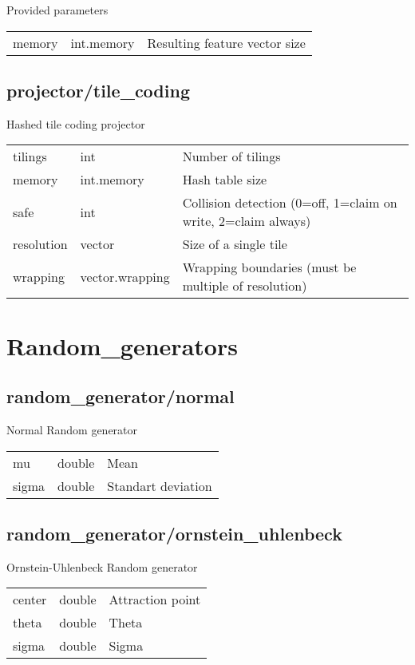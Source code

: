 \noindent Provided parameters\\

\noindent\begin{tabular}{@{}lll@{}}
memory&int.memory&Resulting feature vector size\\
\end{tabular}
\subsection{projector/tile\_coding}
\noindent Hashed tile coding projector\\

\noindent\begin{tabular}{@{}lll@{}}
tilings&int&Number of tilings\\
memory&int.memory&Hash table size\\
safe&int&Collision detection (0=off, 1=claim on write, 2=claim always)\\
resolution&vector&Size of a single tile\\
wrapping&vector.wrapping&Wrapping boundaries (must be multiple of resolution)\\
\end{tabular}
\section{Random\_generators}
\subsection{random\_generator/normal}
\noindent Normal Random generator\\

\noindent\begin{tabular}{@{}lll@{}}
mu&double&Mean\\
sigma&double&Standart deviation\\
\end{tabular}
\subsection{random\_generator/ornstein\_uhlenbeck}
\noindent Ornstein-Uhlenbeck Random generator\\

\noindent\begin{tabular}{@{}lll@{}}
center&double&Attraction point\\
theta&double&Theta\\
sigma&double&Sigma\\
\end{tabular}
